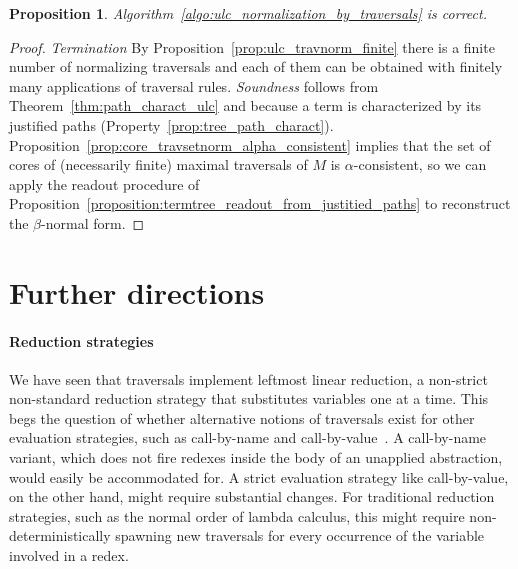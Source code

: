 \documentclass{elsarticle}
\theoremstyle{plain}
\newtheorem{proposition}[theorem]{Proposition}
\theoremstyle{definition}
\newcommand{\travulc}{\travset}
\newcommand\pathset{{\mathcal{P}aths}} %
\begin{document}
\begin{proposition}
    Algorithm~\ref{algo:ulc_normalization_by_traversals} is correct.
\end{proposition}
\begin{proof}
\emph{Termination}  By Proposition~\ref{prop:ulc_travnorm_finite} there is a finite number of normalizing traversals and each of them can be obtained with finitely many applications of traversal rules.
%
\emph{Soundness} follows from Theorem~\ref{thm:path_charact_ulc} and because a term is  characterized by its justified paths (Property~\ref{prop:tree_path_charact}).
Proposition~\ref{prop:core_travsetnorm_alpha_consistent}
implies that
the set of cores of (necessarily finite) maximal traversals of $M$
is $\alpha$-consistent, so we can
apply the readout procedure of Proposition~\ref{proposition:termtree_readout_from_justitied_paths} to
reconstruct the $\beta$-normal form.
\end{proof}


\section{Further directions}

\paragraph{Reduction strategies} We have seen that traversals implement leftmost linear reduction,
a non-strict non-standard reduction strategy that substitutes variables one at a time. This begs the question of whether alternative notions of traversals
exist for other evaluation strategies, such as call-by-name and call-by-value~\cite{plotkin-75}. A call-by-name variant,
which does not fire redexes inside the body of an unapplied abstraction, would easily be accommodated for. A strict evaluation strategy like call-by-value, on the other hand, might require substantial changes. For traditional reduction strategies, such as the normal order of lambda calculus,
this might require non-deterministically spawning new traversals for every occurrence of the variable involved in a redex.
\end{document}
